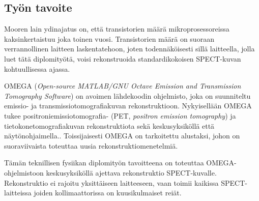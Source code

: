 \subsection{Työn tavoite}
Mooren lain ydinajatus on, että transistorien määrä mikroprosessoreissa kaksinkertaistuu joka toinen vuosi. Transistorien määrä on suoraan verrannollinen laitteen laskentatehoon, joten todennäköisesti sillä laitteella, jolla luet tätä diplomityötä, voisi rekonstruoida standardikokoisen SPECT-kuvan kohtuullisessa ajassa.

OMEGA (\textit{Open-source MATLAB/GNU Octave Emission and Transmission Tomography Software}) on avoimen lähdekoodin ohjelmisto, joka on suunniteltu emissio- ja transmissiotomografiakuvan rekonstruktioon. Nykyisellään OMEGA tukee positroniemissiotomografia- (PET, \textit{positron emission tomography}) ja tietokonetomografiakuvan rekonstruktiota sekä keskusyksiköllä että näytönohjaimella.\cite{wettenhovi_omegaopen-source_2021}. Toissijaisesti OMEGA on tarkoitettu alustaksi, johon on suoraviivaista toteuttaa uusia rekonstruktiomenetelmiä. 

Tämän teknillisen fysiikan diplomityön tavoitteena on toteuttaa OMEGA-ohjelmistoon keskusyksiköllä ajettava rekonstruktio SPECT-kuvalle. Rekonstruktio ei rajoitu yksittäiseen laitteeseen, vaan toimii kaikissa SPECT-laitteissa joiden kollimaattorissa on kuusikulmaiset reiät.